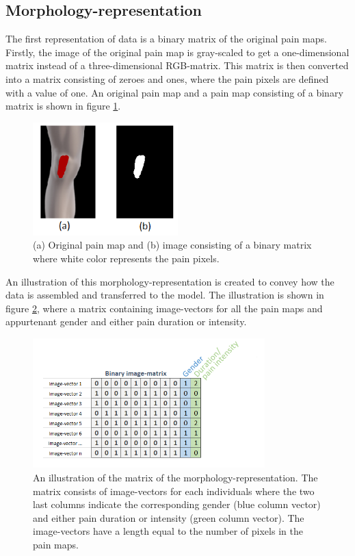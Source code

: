 \subsection{Morphology-representation} \label{sec:Morph}
The first representation of data is a binary matrix of the original pain maps.
Firstly, the image of the original pain map is gray-scaled to get a one-dimensional matrix instead of a three-dimensional RGB-matrix. This matrix is then converted into a matrix consisting of zeroes and ones, where the pain pixels are defined with a value of one. An original pain map and a pain map consisting of a binary matrix is shown in figure \ref{fig:cropbin7}.

\begin{figure} [H]
\centering
\includegraphics[width=0.5\textwidth]{figures/cropbin7}
\caption{(a) Original pain map and (b) image consisting of a binary matrix where white color represents the pain pixels.}
\label{fig:cropbin7}
\end{figure}

\noindent
An illustration of this morphology-representation is created to convey how the data is assembled and transferred to the model. The illustration is shown in figure \ref{fig:binmatrix}, where a matrix containing image-vectors for all the pain maps and appurtenant gender and either pain duration or intensity.

\begin{figure} [H]
\centering
\includegraphics[width=0.8\textwidth]{figures/binaryimagematrix}
\caption{An illustration of the matrix of the morphology-representation. The matrix consists of image-vectors for each individuals where the two last columns indicate the corresponding gender (blue column vector) and either pain duration or intensity (green column vector). The image-vectors have a length equal to the number of pixels in the pain maps.}
\label{fig:binmatrix}
\end{figure}


